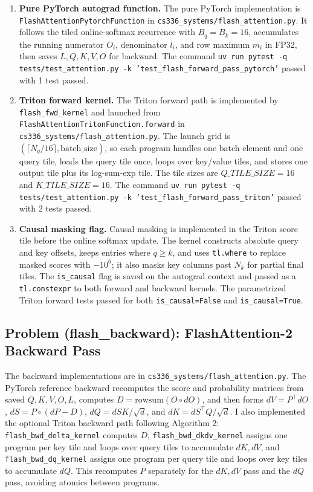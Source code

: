 \documentclass[11pt]{article}
\newcommand{\codepath}[1]{\texttt{#1}}
\newcommand{\testcmd}[1]{\texttt{#1}}
\begin{document}
\begin{enumerate}
  \item \textbf{Pure PyTorch autograd function.}
  The pure PyTorch implementation is \codepath{FlashAttentionPytorchFunction} in \codepath{cs336\_systems/flash\_attention.py}. It follows the tiled online-softmax recurrence with $B_q=B_k=16$, accumulates the running numerator $O_i$, denominator $l_i$, and row maximum $m_i$ in FP32, then saves $L,Q,K,V,O$ for backward. The command \testcmd{uv run pytest -q tests/test\_attention.py -k 'test\_flash\_forward\_pass\_pytorch'} passed with 1 test passed.

  \item \textbf{Triton forward kernel.}
  The Triton forward path is implemented by \codepath{flash\_fwd\_kernel} and launched from \codepath{FlashAttentionTritonFunction.forward} in \codepath{cs336\_systems/flash\_attention.py}. The launch grid is $(\lceil N_q/16\rceil,\mathrm{batch\_size})$, so each program handles one batch element and one query tile, loads the query tile once, loops over key/value tiles, and stores one output tile plus its log-sum-exp tile. The tile sizes are $Q\_TILE\_SIZE=16$ and $K\_TILE\_SIZE=16$. The command \testcmd{uv run pytest -q tests/test\_attention.py -k 'test\_flash\_forward\_pass\_triton'} passed with 2 tests passed.

  \item \textbf{Causal masking flag.}
  Causal masking is implemented in the Triton score tile before the online softmax update. The kernel constructs absolute query and key offsets, keeps entries where $q \ge k$, and uses \codepath{tl.where} to replace masked scores with $-10^6$; it also masks key columns past $N_k$ for partial final tiles. The \codepath{is\_causal} flag is saved on the autograd context and passed as a \codepath{tl.constexpr} to both forward and backward kernels. The parametrized Triton forward tests passed for both \codepath{is\_causal=False} and \codepath{is\_causal=True}.
\end{enumerate}

\subsection{Problem (flash\_backward): FlashAttention-2 Backward Pass}

The backward implementations are in \codepath{cs336\_systems/flash\_attention.py}. The PyTorch reference backward recomputes the score and probability matrices from saved $Q,K,V,O,L$, computes $D=\mathrm{rowsum}(O \circ dO)$, and then forms $dV=P^\top dO$, $dS=P\circ(dP-D)$, $dQ=dS K/\sqrt d$, and $dK=dS^\top Q/\sqrt d$. I also implemented the optional Triton backward path following Algorithm 2: \codepath{flash\_bwd\_delta\_kernel} computes $D$, \codepath{flash\_bwd\_dkdv\_kernel} assigns one program per key tile and loops over query tiles to accumulate $dK,dV$, and \codepath{flash\_bwd\_dq\_kernel} assigns one program per query tile and loops over key tiles to accumulate $dQ$. This recomputes $P$ separately for the $dK,dV$ pass and the $dQ$ pass, avoiding atomics between programs.
\end{document}
